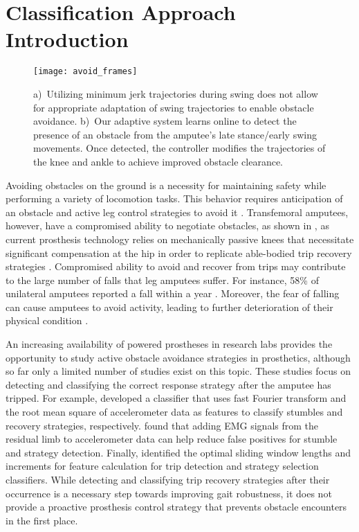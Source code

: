 \section{Classification Approach Introduction}\label{sec:swing_control_class}

\begin{figure*}[t]
\centering
\texttt{[image: avoid\_frames]}
\caption[Comparison of minimum jerk and adaptive swing contrls when stepping
over obstacle]{a)~Utilizing minimum jerk trajectories during swing does not
allow for appropriate adaptation of swing trajectories to enable obstacle
avoidance. b)~Our adaptive system learns online to detect the presence of an
obstacle from the amputee's late stance/early swing movements. Once detected,
the controller modifies the trajectories of the knee and ankle to achieve
improved obstacle clearance.}\label{fig:avoid_frames}
\end{figure*}

Avoiding obstacles on the ground is a necessity for maintaining safety while
performing a variety of locomotion tasks. This behavior requires anticipation of
an obstacle and active leg control strategies to avoid it \citep{patla1995role}.
Transfemoral amputees, however, have a compromised ability to negotiate
obstacles, as shown in , as current prosthesis technology
relies on mechanically passive knees that necessitate significant compensation
at the hip in order to replicate able-bodied trip recovery strategies
\citep{shirota2015transfemoral}. Compromised ability to avoid and recover from
trips may contribute to the large number of falls that leg amputees suffer. For
instance, 58\% of unilateral amputees reported a fall within a year
\citep{kulkarni1996falls}. Moreover, the fear of falling can cause amputees to
avoid activity, leading to further deterioration of their physical condition
\citep{miller2001prevalence}.

An increasing availability of powered prostheses in research labs provides the
opportunity to study active obstacle avoidance strategies in prosthetics,
although so far only a limited number of studies exist on this topic. These
studies focus on detecting and classifying the correct response strategy after
the amputee has tripped. For example, \citet{lawson2010stumble} developed a
classifier that uses fast Fourier transform and the root mean square of
accelerometer data as features to classify stumbles and recovery strategies,
respectively. \citet{zhang2011towards} found that adding EMG signals from the
residual limb to accelerometer data can help reduce false positives for stumble
and strategy detection. Finally, \citet{shirota2014recovery} identified the
optimal sliding window lengths and increments for feature calculation for trip
detection and strategy selection classifiers. While detecting and classifying
trip recovery strategies after their occurrence is a necessary step towards
improving gait robustness, it does not provide a proactive prosthesis control
strategy that prevents obstacle encounters in the first place.

